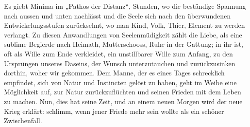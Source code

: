 Es giebt Minima im „Pathos der Distanz“, Stunden, wo die beständige Spannung nach aussen und unten nachlässt und die Seele sich nach den überwundenen Entwickelungsstufen zurücksehnt, wo man Kind, Volk, Thier, Element zu werden verlangt. Zu diesen Anwandlungen von Seelenmüdigkeit zählt die Liebe, als eine sublime Begierde nach Heimath, Mutterschooss, Ruhe in der Gattung; in ihr ist, oft als Wille zum Ende verkleidet, ein unstillbarer Wille zum Anfang, zu den Ursprüngen unseres Daseins, der Wunsch unterzutauchen und zurückzusinken dorthin, woher wir gekommen. Dem Manne, der es eines Tages schrecklich empfindet, sich von Natur und Instincten gelöst zu haben, geht im Weibe eine Möglichkeit auf, zur Natur zurückzuflüchten und seinen Frieden mit dem Leben zu machen. Nun, dies hat seine Zeit, und an einem neuen Morgen wird der neue Krieg erklärt: schlimm, wenn jener Friede mehr sein wollte als ein schöner Zwischenfall.
\par

